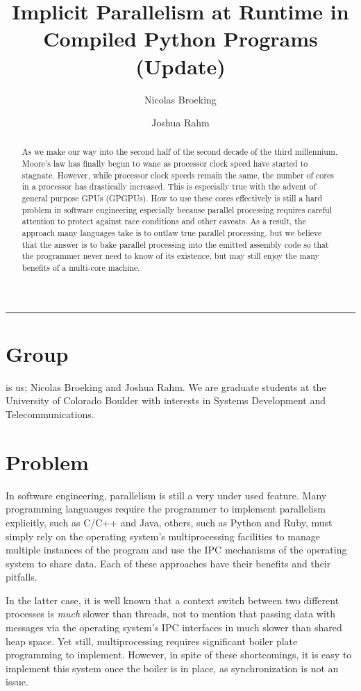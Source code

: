 \documentclass{article}
\title{Implicit Parallelism at Runtime in Compiled Python Programs\\
    (Update)}
\author{Nicolas Broeking \and Joshua Rahm}
\begin{document}
\nocite{*}
\maketitle
\hrule

\begin{multicols}{2}

\begin{abstract}

As we make our way into the second half of the second decade of the third
millennium, Moore's law has finally begun to wane as processor clock speed have
started to stagnate. However, while processor clock speeds remain the same, the
number of cores in a processor has drastically increased. This is especially
true with the advent of general purpose GPUs (GPGPUs). How to use these cores
effectively is still a hard problem in software engineering especially because
parallel processing requires careful attention to protect against race
conditions and other caveats.  As a result, the approach many languages take is
to outlaw true parallel processing, but we believe that the answer is to bake
parallel processing into the emitted assembly code so that the programmer never
need to know of its existence, but may still enjoy the many benefits of a
multi-core machine.

\end{abstract}

\section{Group}
\backslashx is us; Nicolas Broeking and
Joshua Rahm. We are graduate students at the University of Colorado
Boulder with interests in Systems Development and Telecommunications.

\section{Problem} In software engineering, parallelism is still a very under
used feature. Many programming languauges require the programmer to implement
parallelism explicitly, such as C/C++ and Java, others, such as Python and
Ruby, must simply rely on the operating system's multiprocessing facilities to
manage multiple instances of the program and use the IPC mechanisms of the
operating system to share data.  Each of these approaches have their benefits
and their pitfalls.

In the latter case, it is well known that a context switch between two
different processes is \emph{much} slower than threads, not to mention that
passing data with messages via the operating system's IPC interfaces in much
slower than shared heap space. Yet still, multiprocessing requires significant
boiler plate programming to implement. However, in spite of these shortcomings,
it is easy to implement this system once the boiler is in place, as
synchronization is not an issue.


\end{multicols}
\end{document}
